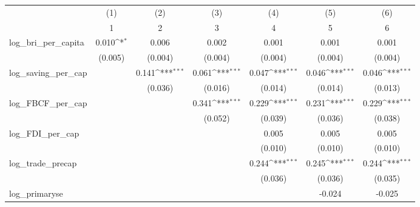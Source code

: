 {
\def\sym#1{\ifmmode^{#1}\else\(^{#1}\)\fi}
\begin{tabular}{l*{6}{c}}
\toprule
            &\multicolumn{1}{c}{(1)}&\multicolumn{1}{c}{(2)}&\multicolumn{1}{c}{(3)}&\multicolumn{1}{c}{(4)}&\multicolumn{1}{c}{(5)}&\multicolumn{1}{c}{(6)}\\
            &\multicolumn{1}{c}{1}&\multicolumn{1}{c}{2}&\multicolumn{1}{c}{3}&\multicolumn{1}{c}{4}&\multicolumn{1}{c}{5}&\multicolumn{1}{c}{6}\\
\midrule
log\_bri\_per\_capita&       0.010\sym{*}  &       0.006         &       0.002         &       0.001         &       0.001         &       0.001         \\
            &     (0.005)         &     (0.004)         &     (0.004)         &     (0.004)         &     (0.004)         &     (0.004)         \\
\addlinespace
log\_saving\_per\_cap&                     &       0.141\sym{***}&       0.061\sym{***}&       0.047\sym{***}&       0.046\sym{***}&       0.046\sym{***}\\
            &                     &     (0.036)         &     (0.016)         &     (0.014)         &     (0.014)         &     (0.013)         \\
\addlinespace
log\_FBCF\_per\_cap&                     &                     &       0.341\sym{***}&       0.229\sym{***}&       0.231\sym{***}&       0.229\sym{***}\\
            &                     &                     &     (0.052)         &     (0.039)         &     (0.036)         &     (0.038)         \\
\addlinespace
log\_FDI\_per\_cap&                     &                     &                     &       0.005         &       0.005         &       0.005         \\
            &                     &                     &                     &     (0.010)         &     (0.010)         &     (0.010)         \\
\addlinespace
log\_trade\_precap&                     &                     &                     &       0.244\sym{***}&       0.245\sym{***}&       0.244\sym{***}\\
            &                     &                     &                     &     (0.036)         &     (0.036)         &     (0.035)         \\
\addlinespace
log\_primaryse&                     &                     &                     &                     &      -0.024         &      -0.025         \\

\end{tabular}}
